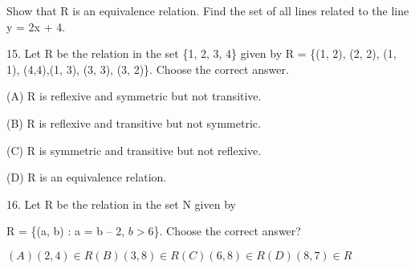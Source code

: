 \documentclass[12pt]{article}
\begin{document}
\begin{enumerate}
Show that R is an equivalence relation. Find the set of all lines related to the line y  = 2x  + 4.

15. Let R be the relation in the set \{1, 2, 3, 4\} given by R = \{(1, 2), (2, 2), (1, 1), (4,4),(1, 3), (3, 3), (3, 2)\}. Choose the correct answer.

(A) R is reflexive and symmetric but not transitive.

(B) R is reflexive and transitive but not symmetric.

(C) R is symmetric and transitive but not reflexive.

(D) R is an equivalence relation.

16. Let R be the relation in the set N  given by 

R = \{(a,  b) : a  = b  – 2, \(b > 6\)\}. Choose the correct answer?

$(A) (2, 4) \in  R (B) (3, 8) \in  R (C) (6, 8) \in  R (D) (8, 7) \in  R$   
\end{enumerate}
\end{document}
